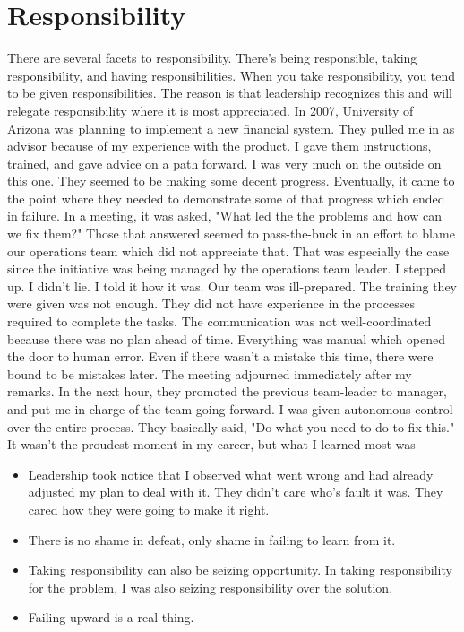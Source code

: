 \documentclass[11pt,a4paper,sans]{article}
\begin{document}
\section{Responsibility}
There are several facets to responsibility. There's being responsible, taking responsibility, and having responsibilities. When you take responsibility, you tend to be given responsibilities. The reason is that leadership recognizes this and will relegate responsibility where it is most appreciated. In 2007, University of Arizona was planning to implement a new financial system. They pulled me in as advisor because of my experience with the product. I gave them instructions, trained, and gave advice on a path forward. I was very much on the outside on this one. They seemed to be making some decent progress. Eventually, it came to the point where they needed to demonstrate some of that progress which ended in failure. In a meeting, it was asked, "What led the the problems and how can we fix them?" Those that answered seemed to pass-the-buck in an effort to blame our operations team which did not appreciate that. That was especially the case since the initiative was being managed by the operations team leader. I stepped up. I didn't lie. I told it how it was. Our team was ill-prepared. The training they were given was not enough. They did not have experience in the processes required to complete the tasks. The communication was not well-coordinated because there was no plan ahead of time. Everything was manual which opened the door to human error. Even if there wasn't a mistake this time, there were bound to be mistakes later. The meeting adjourned immediately after my remarks. In the next hour, they promoted the previous team-leader to manager, and put me in charge of the team going forward. I was given autonomous control over the entire process. They basically said, "Do what you need to do to fix this." It wasn't the proudest moment in my career, but what I learned most was
\begin{itemize}
    \item Leadership took notice that I observed what went wrong and had already adjusted my plan to deal with it. They didn't care who's fault it was. They cared how they were going to make it right. 
    \item There is no shame in defeat, only shame in failing to learn from it.
    \item Taking responsibility can also be seizing opportunity. In taking responsibility for the problem, I was also seizing responsibility over the solution.
    \item Failing upward is a real thing.
\end{itemize}
\end{document}
